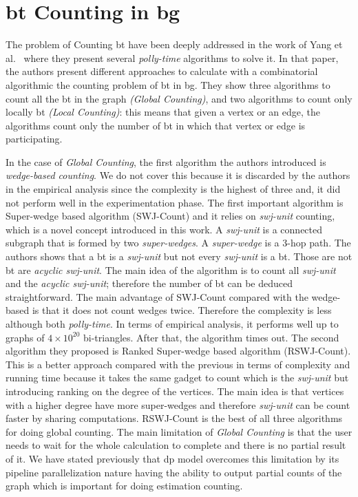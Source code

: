 \section{\acrlong{bt} Counting in \acrlong{bg}}\label{sec:rel-work:counting}
The problem of Counting \acrshort{bt} have been deeply addressed in the work of Yang et al.~\cite{btcount} where they present several \emph{polly-time} algorithms to solve it.
In that paper, the authors present different approaches to calculate with a combinatorial algorithmic the counting problem of \acrshort{bt} in \acrshort{bg}. 
They show three algorithms to count all the \acrshort{bt} in the graph \emph{(Global Counting)}, and two algorithms to count only locally \acrshort{bt} \emph{(Local Counting)}: this means that given a vertex or an edge, the algorithms count only the number of \acrshort{bt} in which 
that vertex or edge is participating.

In the case of \emph{Global Counting}, the first algorithm the authors introduced is \emph{wedge-based counting}. We do not cover this because it is discarded
by the authors in the empirical analysis since the complexity is the highest of three and, it did not perform well in the experimentation phase.
The first important algorithm is Super-wedge based algorithm (SWJ-Count) and it relies on \emph{swj-unit} counting, which is a novel concept introduced in this work. A \emph{swj-unit} is a connected subgraph that is formed by two \emph{super-wedges}. A \emph{super-wedge}
is a 3-hop path. The authors shows that a \acrshort{bt} is a \emph{swj-unit} but not every \emph{swj-unit} is a \acrshort{bt}. Those 
are not \acrshort{bt} are \emph{acyclic swj-unit}. The main idea of the algorithm is to count all \emph{swj-unit} and the \emph{acyclic swj-unit}; therefore
the number of \acrshort{bt} can be deduced straightforward.
The main advantage of SWJ-Count compared with the wedge-based is that it does not count wedges twice.
Therefore the complexity is less although both \emph{polly-time}.
In terms of empirical analysis, it performs well up to graphs of $4 \times 10^20$ bi-triangles. After that, the algorithm times out.
The second algorithm they proposed is Ranked Super-wedge based algorithm (RSWJ-Count). This is a better approach compared with the previous in terms of complexity and running time because it takes the same gadget to count which is the \emph{swj-unit} but introducing ranking on the degree of the vertices. The main idea is that vertices with a higher degree have more super-wedges 
and therefore \emph{swj-unit} can be count faster by sharing computations. RSWJ-Count is the best of all three algorithms for doing global counting.
The main limitation of \emph{Global Counting} is that the user needs to wait for the whole calculation to complete and there is no partial result of it.
We have stated previously that \acrshort{dp} model overcomes this limitation by its pipeline parallelization nature having the ability to output partial counts of the graph which is important for doing estimation counting.


